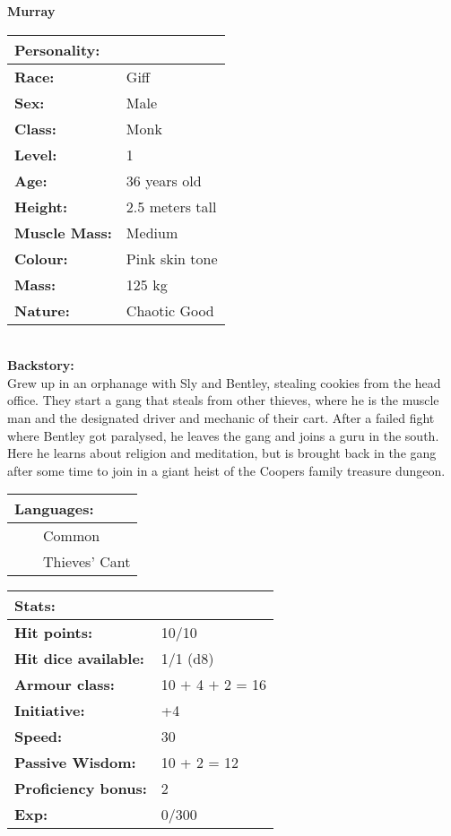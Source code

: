 \documentclass[11pt]{article}
\newcommand{\tabitem}{~~\llap{--}~~}
\begin{document}
	\begin{center}
\Huge \textbf{Murray}
	\end{center}
	\begin{multicols}{2}
\noindent \begin{tabularx}{95mm}{@{}l l}
\Large \textbf{Personality:} 	& 						\\
\hline
\textbf{Race:} 					& Giff		 			\\
\textbf{Sex:} 					& Male 					\\
\textbf{Class:}					& Monk					\\
\textbf{Level:} 				& 1						\\
\textbf{Age:} 					& 36 years old			\\
\textbf{Height:} 				& 2.5 meters tall 		\\
\textbf{Muscle Mass:} 			& Medium 				\\
\textbf{Colour:} 				& Pink skin tone	 	\\
\textbf{Mass:} 					& 125 kg		 		\\
\textbf{Nature:} 				& Chaotic Good
		\end{tabularx} \\
\textbf{Backstory:} \\
Grew up in an orphanage with Sly and Bentley, stealing cookies from the head office. They start a gang that steals from other thieves, where he is the muscle man and the designated driver and mechanic of their cart. After a failed fight where Bentley got paralysed, he leaves the gang and joins a guru in the south. Here he learns about religion and meditation, but is brought back in the gang after some time to join in a giant heist of the Coopers family treasure dungeon.

\noindent \begin{tabularx}{95mm}{@{}l}
{\Large \textbf{Languages:}} \\
\hline
\tabitem Common \\
\tabitem Thieves' Cant
		\end{tabularx}

\vspace{4mm}

\noindent \begin{tabularx}{95mm}{@{}l l}
\Large \textbf{Stats:}		 	& 									\\
\hline
\textbf{Hit points:} 			& 10/10					 			\\
\textbf{Hit dice available:}	& 1/1 (d8)								\\
\textbf{Armour class:} 			& 10 $+$ 4 $+$ 2 = 16			 	\\
\textbf{Initiative:} 			& +4								\\
\textbf{Speed:} 				& 30	 							\\
\textbf{Passive Wisdom:} 		& 10 + 2 = 12	 					\\
\textbf{Proficiency bonus:}		& 2									\\
\textbf{Exp:} 					& 0/300
		\end{tabularx}


\end{multicols}
\end{document}
